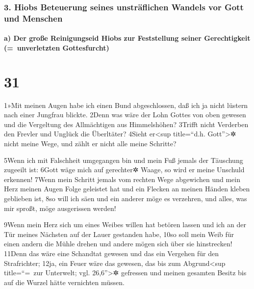 \hypertarget{hiobs-beteuerung-seines-unstruxe4flichen-wandels-vor-gott-und-menschen}{%
\subsubsection{3. Hiobs Beteuerung seines unsträflichen Wandels vor Gott
und
Menschen}\label{hiobs-beteuerung-seines-unstruxe4flichen-wandels-vor-gott-und-menschen}}

\hypertarget{a-der-grouxdfe-reinigungseid-hiobs-zur-feststellung-seiner-gerechtigkeit-unverletzten-gottesfurcht}{%
\paragraph{a) Der große Reinigungseid Hiobs zur Feststellung seiner
Gerechtigkeit (=~unverletzten
Gottesfurcht)}\label{a-der-grouxdfe-reinigungseid-hiobs-zur-feststellung-seiner-gerechtigkeit-unverletzten-gottesfurcht}}

\hypertarget{section-30}{%
\section{31}\label{section-30}}

1»Mit meinen Augen habe ich einen Bund abgeschlossen, daß ich ja nicht
lüstern nach einer Jungfrau blickte. 2Denn was wäre der Lohn Gottes von
oben gewesen und die Vergeltung des Allmächtigen aus Himmelshöhen?
3Trifft nicht Verderben den Frevler und Unglück die Überltäter? 4Sieht
er\textless sup title=``d.h. Gott''\textgreater✲ nicht meine Wege, und
zählt er nicht alle meine Schritte?

5Wenn ich mit Falschheit umgegangen bin und mein Fuß jemals der
Täuschung zugeeilt ist: 6Gott wäge mich auf gerechter✲ Waage, so wird er
meine Unschuld erkennen! 7Wenn mein Schritt jemals vom rechten Wege
abgewichen und mein Herz meinen Augen Folge geleistet hat und ein
Flecken an meinen Händen kleben geblieben ist, 8so will ich säen und ein
anderer möge es verzehren, und alles, was mir sproßt, möge ausgerissen
werden!

9Wenn mein Herz sich um eines Weibes willen hat betören lassen und ich
an der Tür meines Nächsten auf der Lauer gestanden habe, 10so soll mein
Weib für einen andern die Mühle drehen und andere mögen sich über sie
hinstrecken! 11Denn das wäre eine Schandtat gewesen und das ein Vergehen
für den Strafrichter; 12ja, ein Feuer wäre das gewesen, das bis zum
Abgrund\textless sup title=``=~zur Unterwelt; vgl. 26,6''\textgreater✲
gefressen und meinen gesamten Besitz bis auf die Wurzel hätte vernichten
müssen.

